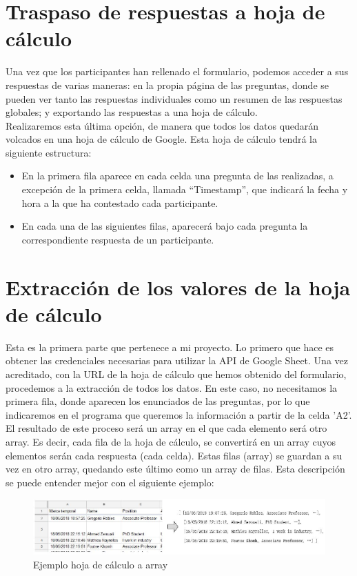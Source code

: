 \documentclass[a4paper, 12pt]{book}
\begin{document}
\section{Traspaso de respuestas a hoja de cálculo}
\label{sec:pasaraExcel}
Una vez que los participantes han rellenado el formulario, podemos acceder a sus respuestas de varias maneras: en la propia página de las preguntas, donde se pueden ver tanto las respuestas individuales como un resumen de las respuestas globales; y exportando las respuestas a una hoja de cálculo.\\

Realizaremos esta última opción, de manera que todos los datos quedarán volcados en una hoja de cálculo de Google. Esta hoja de cálculo tendrá la siguiente estructura:
\begin{itemize}
	\item En la primera fila aparece en cada celda una pregunta de las realizadas, a excepción de la primera celda, llamada ``Timestamp'', que indicará la fecha y hora a la que ha contestado cada participante.
	\item En cada una de las siguientes filas, aparecerá bajo cada pregunta la correspondiente respuesta de un participante.
\end{itemize}


\section{Extracción de los valores de la hoja de cálculo}
\label{sec:extraerExcel}
Esta es la primera parte que pertenece a mi proyecto. Lo primero que hace es obtener las credenciales necesarias para utilizar la API de Google Sheet. Una vez acreditado, con la URL de la hoja de cálculo que hemos obtenido del formulario, procedemos a la extracción de todos los datos. En este caso, no necesitamos la primera fila, donde aparecen los enunciados de las preguntas, por lo que indicaremos en el programa que queremos la información a partir de la celda 'A2'.\\

El resultado de este proceso será un array en el que cada elemento será otro array. Es decir, cada fila de la hoja de cálculo, se convertirá en un array cuyos elementos serán cada respuesta (cada celda). Estas filas (array) se guardan a su vez en otro array, quedando este último como un array de filas. Esta descripción se puede entender mejor con el siguiente ejemplo:

\begin{figure}[h!]
	\centering
	\includegraphics[width=17cm, keepaspectratio]{img/ejemplo45real}
	\caption{Ejemplo hoja de cálculo a array}
	\label{fig:ejemplo4_5}
\end{figure}
\end{document}

